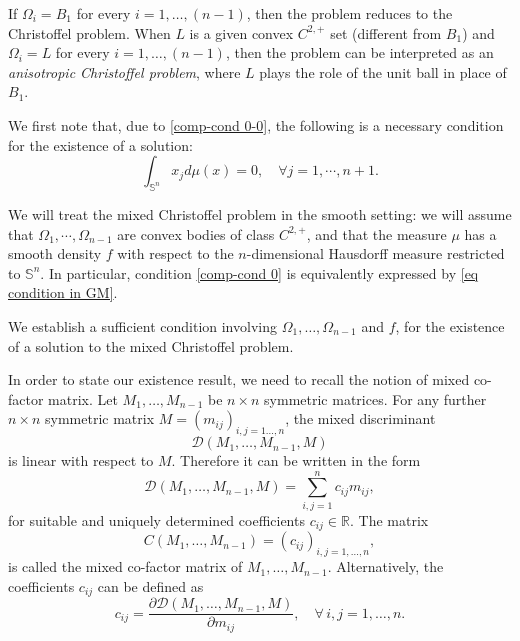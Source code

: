 \documentclass[12pt]{amsart}
\newcommand{\R}{\mathbb R}
\newcommand{\1}{\mathbf 1}
\newcommand{\s}{\mathbb S}
\newcommand{\sfe}{{{\mathbb S}^{n}}}
\begin{document}
If $\Omega_i=B_1$ for every $i=1,\dots,(n-1)$, then the problem reduces to the Christoffel problem. When $L$ is a given convex $C^{2,+}$ set (different from $B_1$) and $\Omega_i=L$ for every $i=1,\dots,(n-1)$, then the problem can be interpreted as an {\em anisotropic Christoffel problem}, where $L$ plays the role of the unit ball in place of $B_1$. 

We first note that, due to \eqref{comp-cond 0-0}, the following is a necessary condition for the existence of a solution:
\begin{equation}\label{comp-cond 0}
\int_{\s^n} x_j d\mu(x)=0, \quad \forall j=1,\cdots, n+1.
\end{equation}

We will treat the mixed Christoffel problem in the smooth setting: we will assume that $\Omega_1,\cdots, \Omega_{n-1}$ are convex bodies of class $C^{2,+}$, and that the measure $\mu$ has a smooth density $f$ with respect to the $n$-dimensional Hausdorff measure restricted to $\sfe$. In particular, condition \eqref{comp-cond 0} is equivalently expressed by \eqref{eq condition in GM}.

We establish a sufficient condition involving $\Omega_1,\dots,\Omega_{n-1}$ and $f$, for the existence of a solution to the mixed Christoffel problem. 

In order to state our existence result, we need to recall the notion of mixed co-factor matrix. Let $M_1,\dots,M_{n-1}$ be $n\times n$ symmetric matrices. For any further $n\times n$ symmetric matrix $M=(m_{ij})_{i,j=1\dots,n}$, the mixed discriminant
$$
\mathscr{D}(M_1,\dots,M_{n-1},M)
$$
is linear with respect to $M$. Therefore it can be written in the form
$$
\mathscr{D}(M_1,\dots,M_{n-1},M)=\sum_{i,j=1}^n c_{ij}m_{ij},
$$
for suitable and uniquely determined coefficients $c_{ij}\in\R$. The matrix
$$
C(M_1,\dots,M_{n-1})=(c_{ij})_{i,j=1,\dots,n},
$$
is called the mixed co-factor matrix of $M_1,\dots, M_{n-1}$. Alternatively, the coefficients $c_{ij}$ can be defined as
\begin{equation}\label{cmc}
c_{ij}=\frac{\partial \mathscr{D}(M_1,\dots,M_{n-1},M)}{\partial m_{ij}},\quad\forall\, i,j=1,\dots,n.
\end{equation}
\end{document}
